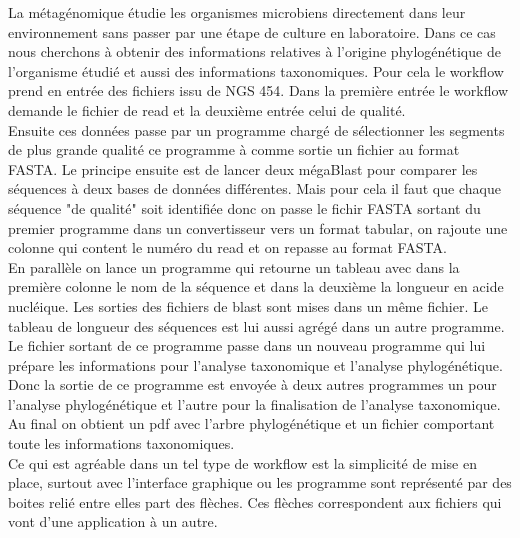 La métagénomique étudie les organismes microbiens directement dans leur environnement sans passer par une étape de culture en laboratoire. Dans ce cas nous cherchons à obtenir des informations relatives à l'origine phylogénétique de l'organisme étudié et aussi des informations taxonomiques. Pour cela le workflow prend en entrée des fichiers issu de NGS 454. Dans la première entrée le workflow demande le fichier de read et la deuxième entrée celui de qualité.\\

 Ensuite ces données passe par un programme chargé de sélectionner les segments de plus grande qualité ce programme à comme sortie un fichier au format FASTA.  Le principe ensuite est de lancer deux mégaBlast pour comparer les séquences à deux bases de données différentes. Mais pour cela il faut que chaque séquence "de qualité" soit identifiée donc on passe le fichir FASTA sortant du premier programme dans un convertisseur vers un format tabular, on rajoute une colonne qui content le numéro du read et on repasse au format FASTA.\\
 
En parallèle on lance un programme qui retourne un tableau avec dans la première colonne le nom de la séquence et dans la deuxième la longueur en acide nucléique. Les sorties des fichiers de blast sont mises dans un même fichier. Le tableau de longueur des séquences est lui aussi agrégé dans un autre programme. Le fichier sortant de ce programme passe dans un nouveau programme qui lui prépare les informations pour l'analyse taxonomique et l'analyse phylogénétique. Donc la sortie de ce programme est envoyée à deux autres programmes un pour l'analyse phylogénétique et l'autre pour la finalisation de l'analyse taxonomique. Au final on obtient un pdf avec l'arbre phylogénétique et un fichier comportant toute les informations taxonomiques.\\



Ce qui est agréable dans un tel type de workflow est la simplicité de mise en place, surtout avec l'interface graphique ou les programme sont représenté par des boites relié entre elles part des flèches. Ces flèches correspondent aux fichiers qui vont d'une application à un autre.\\